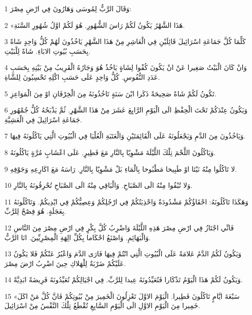 \par 1 وَقَالَ الرَّبُّ لِمُوسَى وَهَارُونَ فِي ارْضِ مِصْرَ:
\par 2 «هَذَا الشَّهْرُ يَكُونُ لَكُمْ رَاسَ الشُّهُورِ. هُوَ لَكُمْ اوَّلُ شُهُورِ السَّنَةِ.
\par 3 كَلِّمَا كُلَّ جَمَاعَةِ اسْرَائِيلَ قَائِلَيْنِ فِي الْعَاشِرِ مِنْ هَذَا الشَّهْرِ يَاخُذُونَ لَهُمْ كُلُّ وَاحِدٍ شَاةً بِحَسَبِ بُيُوتِ الابَاءِ. شَاةً لِلْبَيْتِ.
\par 4 وَانْ كَانَ الْبَيْتُ صَغِيرا عَنْ انْ يَكُونَ كُفْوا لِشَاةٍ يَاخُذُ هُوَ وَجَارُهُ الْقَرِيبُ مِنْ بَيْتِهِ بِحَسَبِ عَدَدِ النُّفُوسِ. كُلُّ وَاحِدٍ عَلَى حَسَبِ اكْلِهِ تَحْسِبُونَ لِلشَّاةِ.
\par 5 تَكُونُ لَكُمْ شَاةً صَحِيحَةً ذَكَرا ابْنَ سَنَةٍ تَاخُذُونَهُ مِنَ الْخِرْفَانِ اوْ مِنَ الْمَوَاعِزِ.
\par 6 وَيَكُونُ عِنْدَكُمْ تَحْتَ الْحِفْظِ الَى الْيَوْمِ الرَّابِعَ عَشَرَ مِنْ هَذَا الشَّهْرِ. ثُمَّ يَذْبَحُهُ كُلُّ جُمْهُورِ جَمَاعَةِ اسْرَائِيلَ فِي الْعَشِيَّةِ.
\par 7 وَيَاخُذُونَ مِنَ الدَّمِ وَيَجْعَلُونَهُ عَلَى الْقَائِمَتَيْنِ وَالْعَتَبَةِ الْعُلْيَا فِي الْبُيُوتِ الَّتِي يَاكُلُونَهُ فِيهَا.
\par 8 وَيَاكُلُونَ اللَّحْمَ تِلْكَ اللَّيْلَةَ مَشْوِيّا بِالنَّارِ مَعَ فَطِيرٍ. عَلَى اعْشَابٍ مُرَّةٍ يَاكُلُونَهُ.
\par 9 لا تَاكُلُوا مِنْهُ نَيْئا اوْ طَبِيخا مَطْبُوخا بِالْمَاءِ بَلْ مَشْوِيّا بِالنَّارِ. رَاسَهُ مَعَ اكَارِعِهِ وَجَوْفِهِ.
\par 10 وَلا تُبْقُوا مِنْهُ الَى الصَّبَاحِ. وَالْبَاقِي مِنْهُ الَى الصَّبَاحِ تُحْرِقُونَهُ بِالنَّارِ.
\par 11 وَهَكَذَا تَاكُلُونَهُ: احْقَاؤُكُمْ مَشْدُودَةٌ وَاحْذِيَتُكُمْ فِي ارْجُلِكُمْ وَعِصِيُّكُمْ فِي ايْدِيكُمْ. وَتَاكُلُونَهُ بِعَجَلَةٍ. هُوَ فِصْحٌ لِلرَّبِّ.
\par 12 فَانِّي اجْتَازُ فِي ارْضِ مِصْرَ هَذِهِ اللَّيْلَةَ وَاضْرِبُ كُلَّ بِكْرٍ فِي ارْضِ مِصْرَ مِنَ النَّاسِ وَالْبَهَائِمِ. وَاصْنَعُ احْكَاما بِكُلِّ الِهَةِ الْمِصْرِيِّينَ. انَا الرَّبُّ.
\par 13 وَيَكُونُ لَكُمُ الدَّمُ عَلامَةً عَلَى الْبُيُوتِ الَّتِي انْتُمْ فِيهَا فَارَى الدَّمَ وَاعْبُرُ عَنْكُمْ فَلا يَكُونُ عَلَيْكُمْ ضَرْبَةٌ لِلْهَلاكِ حِينَ اضْرِبُ ارْضَ مِصْرَ.
\par 14 وَيَكُونُ لَكُمْ هَذَا الْيَوْمُ تَذْكَارا فَتُعَيِّدُونَهُ عِيدا لِلرَّبِّ. فِي اجْيَالِكُمْ تُعَيِّدُونَهُ فَرِيضَةً ابَدِيَّةً.
\par 15 «سَبْعَةَ ايَّامٍ تَاكُلُونَ فَطِيرا. الْيَوْمَ الاوَّلَ تَعْزِلُونَ الْخَمِيرَ مِنْ بُيُوتِكُمْ فَانَّ كُلَّ مَنْ اكَلَ خَمِيرا مِنَ الْيَوْمِ الاوَّلِ الَى الْيَوْمِ السَّابِعِ تُقْطَعُ تِلْكَ النَّفْسُ مِنْ اسْرَائِيلَ.
